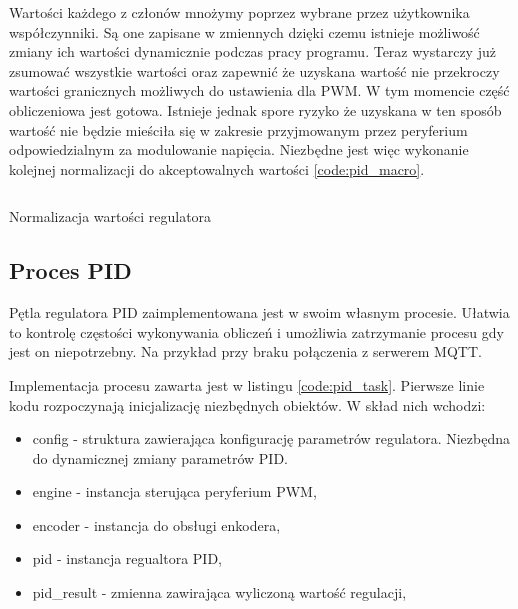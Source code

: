          Wartości każdego z członów mnożymy poprzez wybrane przez użytkownika współczynniki. Są one zapisane w zmiennych dzięki czemu istnieje możliwość zmiany ich wartości dynamicznie podczas pracy programu. Teraz wystarczy już zsumować wszystkie wartości oraz zapewnić że uzyskana wartość nie przekroczy wartości granicznych możliwych do ustawienia dla PWM. W tym momencie część obliczeniowa jest gotowa. Istnieje jednak spore ryzyko że uzyskana w ten sposób wartość nie będzie mieściła się w zakresie przyjmowanym przez peryferium odpowiedzialnym za modulowanie napięcia. Niezbędne jest więc wykonanie kolejnej normalizacji do akceptowalnych wartości  \ref{code:pid_macro}. 
       
        \begin{kod}
          \inputminted[firstline=10,lastline=16]{cpp}{esp/listings/pid.hpp}
          \caption{Normalizacja wartości regulatora}
          \label{code:pid_macro}
          \vspace{1em}
        \end{kod}
    
    \subsection{Proces PID}
        Pętla regulatora PID zaimplementowana jest w swoim własnym procesie. Ułatwia to kontrolę częstości wykonywania obliczeń i umożliwia zatrzymanie procesu gdy jest on niepotrzebny. Na przykład przy braku połączenia z serwerem MQTT.
        
        Implementacja procesu zawarta jest w listingu \ref{code:pid_task}. Pierwsze linie kodu rozpoczynają inicjalizację niezbędnych obiektów. W skład nich wchodzi:
        
        \begin{itemize}
            \item config - struktura zawierająca konfigurację parametrów regulatora. Niezbędna do dynamicznej zmiany parametrów PID.
            
            \item engine - instancja sterująca peryferium PWM,
            \item encoder - instancja do obsługi enkodera,
            \item pid - instancja regualtora PID,
            \item pid\_result - zmienna zawirająca wyliczoną wartość regulacji,
        \end{itemize}
        
